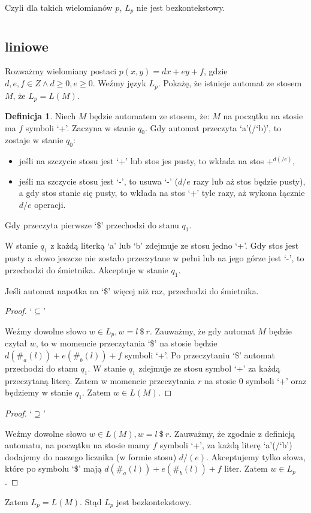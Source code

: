\documentclass{article}
\theoremstyle{definition}
\newtheorem{definition}{Definicja}[section]
\theoremstyle{remark}
\begin{document}
Czyli dla takich wielomianów \(p\), \(L_p\) nie jest bezkontekstowy.

\section{}

\subsection{liniowe}
Rozważmy wielomiany postaci \(p(x,y)=dx + ey + f\), gdzie \(d,e,f \in Z \land d \geq 0, e \geq 0\).
Weźmy język \(L_p\). Pokażę, że istnieje automat ze stosem \(M\),
że \(L_p = L(M)\).

\begin{definition}
    Niech \(M\) będzie automatem ze stosem, że:
    \(M\) na początku na stosie ma \(f\) symboli `+'.
    Zaczyna w stanie \(q_0\).
    Gdy automat przeczyta `a'(/`b)', to zostaje w stanie \(q_0\):
    \begin{itemize}
        \item jeśli na szczycie stosu jest `+' lub stos jes pusty, to wkłada na stos \(+^{d(/e)}\),
        \item jeśli na szczycie stosu jest `-', to usuwa `-' (\(d/e\) razy lub aż stos będzie pusty),
        a gdy stos stanie się pusty, to wkłada na stos `+' tyle razy, aż wykona łącznie \(d/e\) operacji.
    \end{itemize}

    Gdy przeczyta pierwsze `\$' przechodzi do stanu \(q_1\).

    W stanie \(q_1\) z każdą literką `a' lub `b' zdejmuje ze stosu jedno `+'.
    Gdy stos jest pusty a słowo jeszcze nie zostało przeczytane w pełni lub na jego górze jest `-',
    to przechodzi do śmietnika.
    Akceptuje w stanie \(q_1\).

    Jeśli automat napotka na `\$' więcej niż raz, przechodzi do śmietnika.
\end{definition}

\begin{proof}
    `\(\subseteq\)'

    Weźmy dowolne słowo \(w \in L_p, w = l \ \$ \ r\).
    Zauważmy, że gdy automat \(M\) będzie czytał \(w\),
    to w momencie przeczytania `\$' na stosie będzie \(d(\#_{a}(l))+e(\#_{b}(l))+f\) symboli `+'.
    Po przeczytaniu `\$' automat przechodzi do stanu \(q_1\).
    W stanie \(q_1\) zdejmuje ze stosu symbol `+' za każdą przeczytaną literę.
    Zatem w momencie przeczytania \(r\) na stosie 0 symboli `+' oraz będziemy w stanie \(q_1\).
    Zatem \(w \in L(M)\).
\end{proof}
\begin{proof}
    `\(\supseteq\)'

    Weźmy dowolne słowo \(w \in L(M), w = l \ \$ \ r\).
    Zauważmy, że zgodnie z definicją automatu,
    na początku na stosie mamy \(f\) symboli `+',
    za każdą literę `a'(/`b') dodajemy do naszego licznika (w formie stosu) \(d/(e)\).
    Akceptujemy tylko słowa, które po symbolu `\$' mają \(d(\#_{a}(l))+e(\#_{b}(l))+f\) liter.
    Zatem \(w \in L_p\).
\end{proof}

Zatem \(L_p = L(M)\).
Stąd \(L_p\) jest bezkontekstowy.
\end{document}
